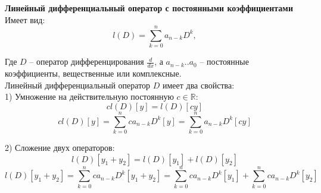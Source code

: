 \documentclass{article}
\begin{document}
	
	\textbf{Линейный дифференциальный оператор с постоянными коэффициентами}\\

	Имеет вид:
	\begin{equation}
		l(D) = \sum_{k=0}^n a_{n-k}D^k,
	\end{equation}

	Где $D$ -- оператор дифференцирования $\frac{d}{dx}$, а $a_{n-k}..a_0$ -- постоянные коэффициенты, вещественные или комплексные.\\

	Линейный дифференциальный оператор $D$ имеет два свойства:\\

	1) Умножение на действительную постоянную $c\in\mathbb{R}$:
	\begin{equation}
		cl(D)[y] = l(D)[cy]
	\end{equation}
	\begin{equation}
		cl(D)[y] = \sum_{k=0}^n ca_{n-k}D^k[y] = \sum_{k=0}^n a_{n-k}D^k[cy] 
	\end{equation}

	2) Сложение двух операторов:
	\begin{equation}
		l(D)[y_1+y_2] = l(D)[y_1] + l(D)[y_2]
	\end{equation}
	\begin{equation}
		l(D)[y_1+y_2] = \sum_{k=0}^n ca_{n-k}D^k[y_1 + y_2] = \sum_{k=0}^n ca_{n-k}D^k[y_1] + \sum_{k=0}^n ca_{n-k}D^k[y_2]
	\end{equation}
\end{document}
